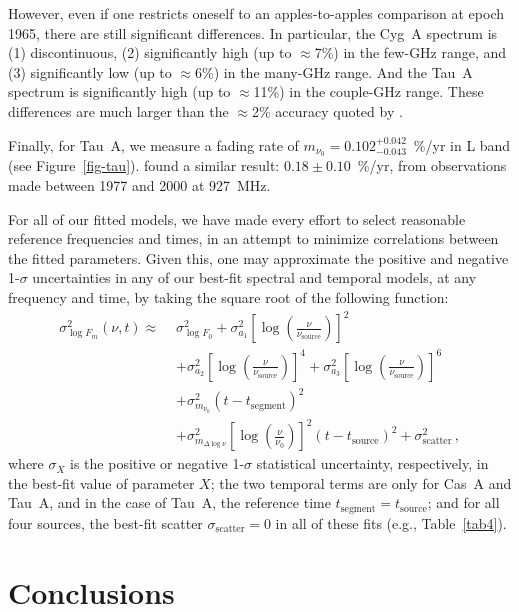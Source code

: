 \documentclass[fleqn,usenatbib]{mnras}
\begin{document}
However, even if one restricts oneself to an apples-to-apples comparison at epoch 1965, there are still significant differences.  In particular, the \citet{b77} Cyg~A spectrum is (1) discontinuous, (2) significantly high (up to $\approx$7\%) in the few-GHz range, and (3) significantly low (up to $\approx$6\%) in the many-GHz range.  And the \citet{b77} Tau~A spectrum is significantly high (up to $\approx$11\%) in the couple-GHz range.  These differences are much larger than the $\approx$2\% accuracy quoted by \citet{b77}.

Finally, for Tau~A, we measure a fading rate of $m_{\nu_0} = 0.102^{+0.042}_{-0.043}$~\%/yr in L band (see Figure~\ref{fig-tau}).  \citet{v07b} found a similar result:  $0.18\pm0.10$~\%/yr, from observations made between 1977 and 2000 at 927~MHz.  

For all of our fitted models, we have made every effort to select reasonable reference frequencies and times, in an attempt to minimize correlations between the fitted parameters.  Given this, one may approximate the positive and negative 1-$\sigma$ uncertainties in any of our best-fit spectral and temporal models, at any frequency and time, by taking the square root of the following function:
\begin{equation}
\begin{split}
\sigma_{\log F_m}^2(\nu,t) \approx\,\, &\sigma_{\log F_0}^2 + \sigma_{a_1}^2\left[\log\left(\frac{\nu}{\nu_\mathrm{source}}\right)\right]^2 \\
& + \sigma_{a_2}^2\left[\log\left(\frac{\nu}{\nu_\mathrm{source}}\right)\right]^4  
+ \sigma_{a_3}^2\left[\log\left(\frac{\nu}{\nu_\mathrm{source}}\right)\right]^6 \\
& + \sigma_{m_{\nu_0}}^2(t-t_{\mathrm{segment}})^2 \\
& +\sigma_{m_{\Delta\log\nu}}^2\left[\log\left(\frac{\nu}{\nu_0}\right)\right]^2(t-t_\mathrm{source})^2 + \sigma_\mathrm{scatter}^2 \, ,
\end{split} 
\label{envelope}
\end{equation}
\noindent where $\sigma_X$ is the positive or negative 1-$\sigma$ statistical uncertainty, respectively, in the best-fit value of parameter $X$; the two temporal terms are only for Cas~A and Tau~A, and in the case of Tau~A, the reference time $t_\mathrm{segment} = t_\mathrm{source}$; and for all four sources, the best-fit scatter $\sigma_\mathrm{scatter} = 0$ in all of these fits (e.g., Table~\ref{tab4}).


\section{Conclusions}\label{conclusion}
\end{document}
